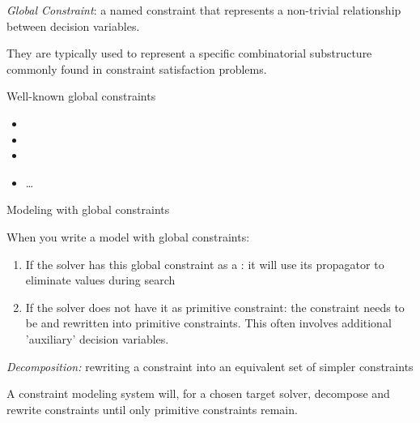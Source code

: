 \documentclass{cons-beamer}
\begin{document}
\begin{frame}
  \begin{definition}
    \textit{Global Constraint}: a named constraint that represents a non-trivial relationship between decision variables.
  \end{definition}
  \vfill
  
  They are typically used to represent a specific combinatorial substructure commonly found in constraint satisfaction problems.
  \vfill
  
  \begin{example}
    Well-known global constraints
    \begin{itemize}
      \item {}
      \item {}
      \item {}
      \item \dots
    \end{itemize}
  \end{example}
\end{frame}

\begin{frame}{Modeling with global constraints}
	
	When you write a model with global constraints:
	
	\begin{enumerate}
		\item If the solver has this global constraint as a : it will use its propagator to eliminate values during search
		
		\item If the solver does not have it as primitive constraint: the constraint needs to be  and rewritten into primitive constraints. This often involves additional 'auxiliary' decision variables.
	\end{enumerate}
	\vfill
	
	\begin{definition}
		\textit{Decomposition:} rewriting a constraint into an equivalent set of simpler constraints
	\end{definition}
	\vfill
	
	A constraint modeling system will, for a chosen target solver, decompose and rewrite constraints until only primitive constraints remain.
\end{frame}
\end{document}
